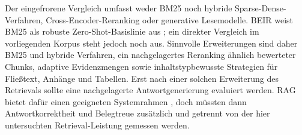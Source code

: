 \documentclass[11pt]{article}
\begin{document}
Der eingefrorene Vergleich umfasst weder BM25 noch hybride Sparse-Dense-Verfahren, Cross-Encoder-Reranking oder generative Lesemodelle. BEIR weist BM25 als robuste Zero-Shot-Basislinie aus \citep{thakur2021beir}; ein direkter Vergleich im vorliegenden Korpus steht jedoch noch aus. Sinnvolle Erweiterungen sind daher BM25 und hybride Verfahren, ein nachgelagertes Reranking ähnlich bewerteter Chunks, adaptive Evidenzmengen sowie inhaltstypbewusste Strategien für Fließtext, Anhänge und Tabellen. Erst nach einer solchen Erweiterung des Retrievals sollte eine nachgelagerte Antwortgenerierung evaluiert werden. RAG bietet dafür einen geeigneten Systemrahmen \citep{lewis2020rag}, doch müssten dann Antwortkorrektheit und Belegtreue zusätzlich und getrennt von der hier untersuchten Retrieval-Leistung gemessen werden.


\end{document}
